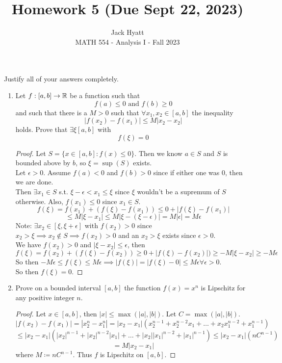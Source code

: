 \documentclass[14pt]{extarticle}
\begin{document}
	
	
	
	\title{Homework 5 (Due Sept 22, 2023)}
	\author{Jack Hyatt\\ %
		MATH 554 - Analysis I - Fall 2023} 
	
	\maketitle
	
	Justify all of your answers completely.\\
	
	
	\medskip 
	
	\begin{enumerate}
		\item Let $f:[a,b] \rightarrow \mathbb{R}$ be a function such that 
		\[f(a) \leq 0 \text{ and } f(b) \geq 0\]
		and such that there is a $M > 0$ such that $\forall x_1,x_2 \in [a,b]$ the inequality
		\[|f(x_2) - f(x_1)| \leq M|x_2 - x_2|\]
		holds. Prove that $\exists \xi [a,b]$ with \[f(\xi) = 0\]
		\begin{proof}
			Let $S = \{x \in [a,b]: f(x) \leq 0\}$. Then we know $a \in S$ and $S$ is bounded above by $b$, so $\xi = \sup(S)$ exists.\\
			Let $\epsilon > 0$. Assume $f(a) < 0$ and $f(b) > 0$ since if either one was $0$, then we are done.\\
			Then $\exists x_1 \in S$ s.t. $\xi - \epsilon < x_1 \leq \xi$ since $\xi$ wouldn't be a supremum of $S$ otherwise. Also, $f(x_1) \leq 0$ since $x_1 \in S$.\\
			\[f(\xi) = f(x_1) + (f(\xi) - f(x_1)) \leq 0 + |f(\xi) -f(x_1)|\]
			\[\leq M|\xi - x_1| \leq M|\xi - (\xi-\epsilon)| = M |\epsilon| = M \epsilon\]
			Note: $\exists x_2 \in [\xi , \xi + \epsilon]$ with $f(x_2) > 0$ since $x_2 > \xi \implies x_2 \nin S \implies f(x_2) >0$ and an $x_2 > \xi$ exists since $\epsilon>0$.\\
			We have $f(x_2)>0$ and $|\xi - x_2| \leq \epsilon$, then
			\[f(\xi) = f(x_2) + (f(\xi) - f(x_2)) \geq 0 + |f(\xi) - f(x_2)|) \geq -M|\xi - x_2| \geq -M\epsilon\]
			So then $-M\epsilon \leq f(\xi) \leq M\epsilon \implies |f(\xi)| = |f(\xi) - 0 | \leq M\epsilon \forall\epsilon>0$.\\
			So then $f(\xi) = 0$.
			
		\end{proof}
		\item Prove on a bounded interval $[a,b]$ the function $f(x) = x^n$ is Lipschitz for any positive integer $n$.
		\begin{proof}
			Let $x \in [a,b]$, then $|x| \leq \max(|a|,|b|)$. Let $C = \max(|a|,|b|)$.
			\[|f(x_2)-f(x_1)| = |x^n_2 - x^n_1| = |x_2-x_1|(x^{n-1}_2+x^{n-2}_2x_1+\ldots+x_2x^{n-2}_1 + x^{n-1}_1)\]
			\[\leq |x_2-x_1|(|x_2|^{n-1}+|x_2|^{n-2}|x_1|+\ldots+|x_2||x_1|^{n-2} + |x_1|^{n-1}) \leq |x_2-x_1|(nC^{n-1})\]
			\[= M|x_2-x_1|\]
			where $M \coloneq nC^{n-1}$. Thus $f$ is Lipschitz on $[a,b]$.
		\end{proof}
		

\end{enumerate}
\end{document}

